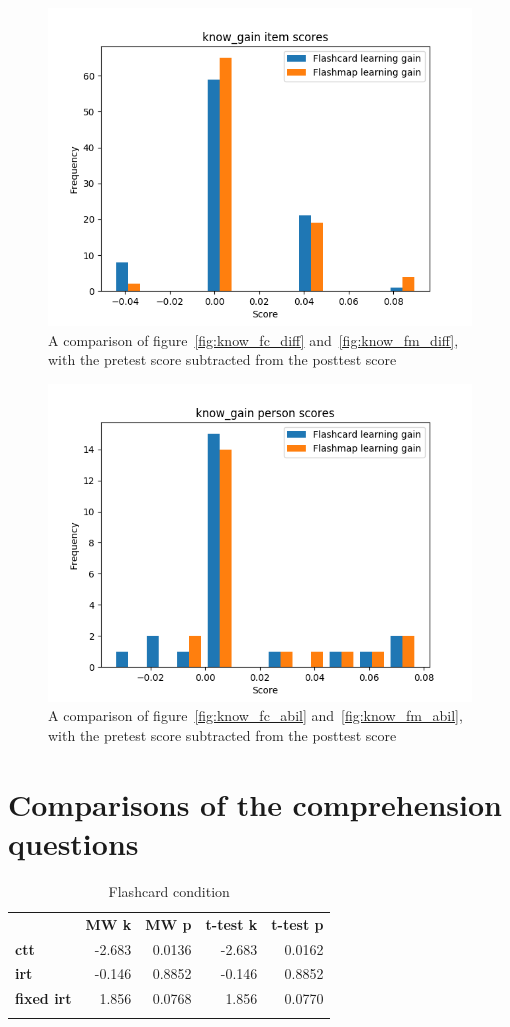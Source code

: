 \begin{figure}
    \centering
    \includegraphics[width=.7\textwidth]{img/know_gain_diff.png}
    \caption{A comparison of figure~\protect\ref{fig:know_fc_diff} and~\protect\ref{fig:know_fm_diff}, with the pretest score subtracted from the posttest score}
    \label{fig:know_gain_diff}
\end{figure}
\begin{figure}
    \centering
    \includegraphics[width=.7\textwidth]{img/know_gain_abil.png}
    \caption{A comparison of figure~\protect\ref{fig:know_fc_abil} and~\protect\ref{fig:know_fm_abil}, with the pretest score subtracted from the posttest score}
    \label{fig:know_gain_abil}
\end{figure}

\FloatBarrier
\section{Comparisons of the comprehension questions}

\begin{longtable}[c]{@{}lrrrr@{}}
\caption{Flashcard condition}
\endfirsthead
\endhead
\toprule\addlinespace
& \textbf{MW k} & \textbf{MW p} &
\textbf{t-test k} & \textbf{t-test p}
\\\addlinespace
\midrule
\textbf{ctt} & -2.683 & 0.0136 & -2.683 & 0.0162
\\\addlinespace
\textbf{irt} & -0.146 & 0.8852 & -0.146 & 0.8852
\\\addlinespace
\textbf{fixed irt} & 1.856 & 0.0768 & 1.856 & 0.0770
\\\addlinespace
\bottomrule
    \label{tab:comp_pp_fc_comp}
\end{longtable}

